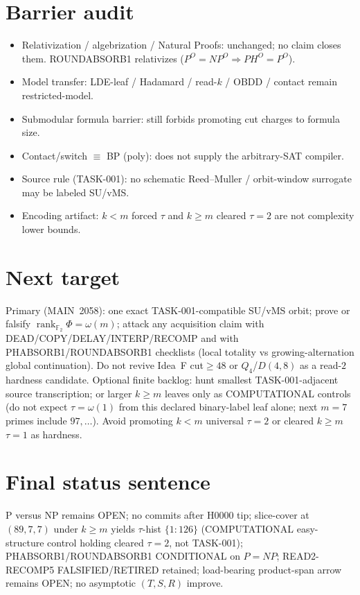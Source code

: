 \documentclass[11pt]{article}
\begin{document}
\section*{Barrier audit}
\begin{itemize}
\item Relativization / algebrization / Natural Proofs: unchanged; no claim closes them.
  ROUNDABSORB1 relativizes ($P^O{=}NP^O\Rightarrow PH^O{=}P^O$).
\item Model transfer: LDE-leaf / Hadamard / read-$k$ / OBDD / contact remain restricted-model.
\item Submodular formula barrier: still forbids promoting cut charges to formula size.
\item Contact/switch $\equiv$ BP (poly): does not supply the arbitrary-SAT compiler.
\item Source rule (TASK-001): no schematic Reed--Muller / orbit-window surrogate may be labeled SU/vMS.
\item Encoding artifact: $k{<}m$ forced $\tau$ and $k{\ge}m$ cleared $\tau{=}2$ are not complexity lower bounds.
\end{itemize}

\section*{Next target}
Primary (MAIN~2058): one exact TASK-001-compatible SU/vMS orbit; prove or falsify
$\operatorname{rank}_{\mathbb F_2}\Phi=\omega(m)$; attack any acquisition claim with
DEAD/COPY/DELAY/INTERP/RECOMP and with PHABSORB1/ROUNDABSORB1 checklists
(local totality vs growing-alternation global continuation).
Do not revive Idea~F cut$\ge48$ or $Q_4$/$D(4,8)$ as a read-$2$ hardness candidate.
Optional finite backlog: hunt smallest TASK-001-adjacent source transcription;
or larger $k{\ge}m$ leaves only as COMPUTATIONAL controls (do not expect $\tau=\omega(1)$
from this declared binary-label leaf alone; next $m{=}7$ primes include $97,\ldots$).
Avoid promoting $k{<}m$ universal $\tau{=}2$ or cleared $k{\ge}m$ $\tau{=}1$ as hardness.

\section*{Final status sentence}
P versus NP remains OPEN; no commits after H0000 tip; slice-cover at $(89,7,7)$ under
$k{\ge}m$ yields $\tau$-hist $\{1{:}126\}$ (COMPUTATIONAL easy-structure control holding
cleared $\tau{=}2$, not TASK-001); PHABSORB1/ROUNDABSORB1 CONDITIONAL on $P{=}NP$;
READ2-RECOMP5 FALSIFIED/RETIRED retained; load-bearing product-span arrow remains OPEN;
no asymptotic $(T,S,R)$ improve.
\end{document}
